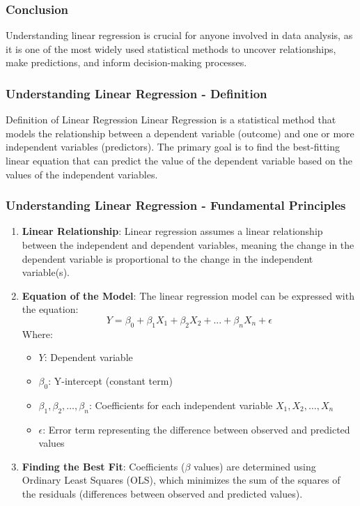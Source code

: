 \documentclass{beamer}
\begin{document}
\begin{frame}[fragile]
    \frametitle{Conclusion}
    Understanding linear regression is crucial for anyone involved in data analysis, as it is one of the most widely used statistical methods to uncover relationships, make predictions, and inform decision-making processes.
\end{frame}

\begin{frame}[fragile]
    \frametitle{Understanding Linear Regression - Definition}
    \begin{block}{Definition of Linear Regression}
        Linear Regression is a statistical method that models the relationship between a dependent variable (outcome) and one or more independent variables (predictors). 
        The primary goal is to find the best-fitting linear equation that can predict the value of the dependent variable based on the values of the independent variables.
    \end{block}
\end{frame}

\begin{frame}[fragile]
    \frametitle{Understanding Linear Regression - Fundamental Principles}
    \begin{enumerate}
        \item \textbf{Linear Relationship}:
        Linear regression assumes a linear relationship between the independent and dependent variables, meaning the change in the dependent variable is proportional to the change in the independent variable(s).
        
        \item \textbf{Equation of the Model}:
        The linear regression model can be expressed with the equation:
        \begin{equation}
            Y = \beta_0 + \beta_1 X_1 + \beta_2 X_2 + ... + \beta_n X_n + \epsilon
        \end{equation}
        Where:
        \begin{itemize}
            \item \( Y \): Dependent variable
            \item \( \beta_0 \): Y-intercept (constant term)
            \item \( \beta_1, \beta_2, \ldots, \beta_n \): Coefficients for each independent variable \( X_1, X_2, \ldots, X_n \)
            \item \( \epsilon \): Error term representing the difference between observed and predicted values
        \end{itemize}
        
        \item \textbf{Finding the Best Fit}:
        Coefficients (\( \beta \) values) are determined using Ordinary Least Squares (OLS), which minimizes the sum of the squares of the residuals (differences between observed and predicted values).
    \end{enumerate}
\end{frame}
\end{document}

